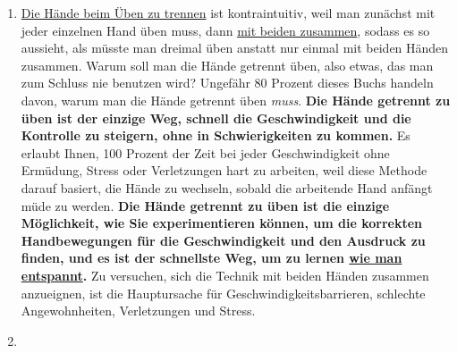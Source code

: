 \begin{enumerate}
	\item 

\hyperlink{c1ii7}{Die Hände beim Üben zu trennen} ist kontraintuitiv, weil man zunächst mit jeder einzelnen Hand üben muss, dann \hyperlink{c1ii25}{mit beiden zusammen}, sodass es so aussieht, als müsste man dreimal üben anstatt nur einmal mit beiden Händen zusammen.
 Warum soll man die Hände getrennt üben, also etwas, das man zum Schluss nie benutzen wird?
 Ungefähr 80 Prozent dieses Buchs handeln davon, warum man die Hände getrennt üben \textit{muss}.
 \textbf{Die Hände getrennt zu üben ist der einzige Weg, schnell die Geschwindigkeit und die Kontrolle zu steigern, ohne in Schwierigkeiten zu kommen.}
 Es erlaubt Ihnen, 100 Prozent der Zeit bei jeder Geschwindigkeit ohne Ermüdung, Stress oder Verletzungen hart zu arbeiten, weil diese Methode darauf basiert, die Hände zu wechseln, sobald die arbeitende Hand anfängt müde zu werden.
 \textbf{Die Hände getrennt zu üben ist die einzige Möglichkeit, wie Sie experimentieren können, um die korrekten Handbewegungen für die Geschwindigkeit und den Ausdruck zu finden, und es ist der schnellste Weg, um zu lernen \hyperlink{c1ii14}{wie man entspannt}.}
 Zu versuchen, sich die Technik mit beiden Händen zusammen anzueignen, ist die Hauptursache für Geschwindigkeitsbarrieren, schlechte Angewohnheiten, Verletzungen und Stress.
 
	\item 


\end{enumerate}

